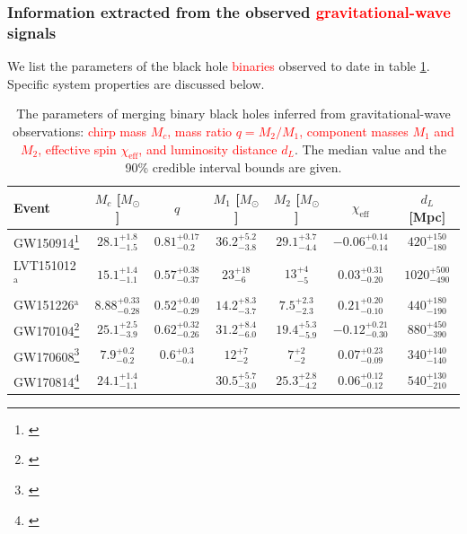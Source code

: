 \documentclass[iop,onecolumn]{revtex4}
\newcommand{\ajf}[1]{\textcolor{red}{#1}}
\begin{document}
\subsubsection{Information extracted from the observed \ajf{gravitational-wave} signals}
We list the parameters of the black hole \ajf{binaries} observed to date in table \ref{table:BHmasses}. Specific system properties are discussed below.

\begin{table}
\begin{tabular}{lcccccc}
Event  & $M_c$ [$M_\odot$]  & $q$ & $M_1$ [$M_\odot$]  & $M_2$ [$M_\odot$]  & $\chi_\textrm{eff}$ & $d_L$ [Mpc] \\
\hline
GW150914\footnote{\citet{BBH:O1}} & $28.1^{+1.8}_{-1.5}$ & $0.81^{+0.17}_{-0.2}$ & $36.2^{+5.2}_{-3.8}$ & $29.1^{+3.7}_{-4.4}$ & $-0.06^{+0.14}_{-0.14}$ & $420^{+150}_{-180}$\\
LVT151012$^\mathrm{a}$ & $15.1^{+1.4}_{-1.1}$ &$0.57^{+0.38}_{-0.37}$ &$23^{+18}_{-6}$ &$13^{+4}_{-5}$ &$0.03^{+0.31}_{-0.20}$ &$1020^{+500}_{-490}$\\
GW151226$^\mathrm{a}$ & $8.88^{+0.33}_{-0.28}$ &$0.52^{+0.40}_{-0.29}$ &$14.2^{+8.3}_{-3.7}$ &$7.5^{+2.3}_{-2.3}$ &$0.21^{+0.20}_{-0.10}$ &$440^{+180}_{-190}$ \\
GW170104\footnote{\citet{GW170104}} & $25.1^{+2.5}_{-3.9}$ &$0.62^{+0.32}_{-0.26}$ &$31.2^{+8.4}_{-6.0}$ &$19.4^{+5.3}_{-5.9}$ &$-0.12^{+0.21}_{-0.30}$ &$880^{+450}_{-390}$\\
GW170608\footnote{\citet{GW170608}} & $7.9^{+0.2}_{-0.2}$ &$0.6^{+0.3}_{-0.4}$ &$12^{+7}_{-2}$ &$7^{+2}_{-2}$ &$0.07^{+0.23}_{-0.09}$ &$340^{+140}_{-140}$ \\
GW170814\footnote{\citet{GW170814}} & $24.1^{+1.4}_{-1.1}$ & &$30.5^{+5.7}_{-3.0}$ &$25.3^{+2.8}_{-4.2}$ &$0.06^{+0.12}_{-0.12}$ & $540^{+130}_{-210}$ \\
\hline
\end{tabular}
\caption{The parameters of merging binary black holes inferred from gravitational-wave observations: \ajf{chirp mass $M_c$, mass ratio $q=M_2/M_1$, component masses $M_1$ and $M_2$, effective spin $\chi_\textrm{eff}$, and luminosity distance $d_L$}.  The median value and the 90\% credible interval bounds are given.}\label{table:BHmasses}
\end{table}
\end{document}
